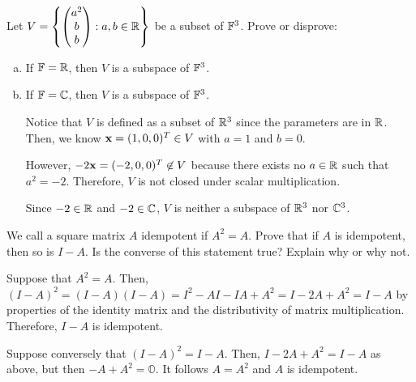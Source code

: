 \documentclass{agony}
\begin{document}
\begin{prob}
  Let $V = \qty{\mqty(a^2\\b\\b) : a,b\in\R}$ be a subset of $\mathbb{F}^3$.
  Prove or disprove:
\end{prob}
\begin{enumerate}[(a)]
  \item If $\mathbb{F}=\mathbb{R}$, then $V$ is a subspace of $\mathbb{F}^3$.
  \item If $\mathbb{F}=\mathbb{C}$, then $V$ is a subspace of $\mathbb{F}^3$.
        \begin{sol}
          Notice that $V$ is defined as a subset of $\mathbb{R}^3$ since the parameters are in $\mathbb{R}$.
          Then, we know $\vb x = (1,0,0)^T \in V$ with $a = 1$ and $b = 0$.

          However, $-2\vb x = (-2,0,0)^T \not\in V$ because there exists
          no $a \in \mathbb{R}$ such that $a^2 = -2$.
          Therefore, $V$ is not closed under scalar multiplication.

          Since $-2 \in \mathbb{R}$ and $-2 \in \mathbb{C}$, $V$ is neither a subspace of $\mathbb{R}^3$ nor $\mathbb{C}^3$.
        \end{sol}
\end{enumerate}

\begin{prob}
  We call a square matrix $A$ idempotent if $A^2=A$.
  Prove that if $A$ is idempotent, then so is $I-A$.
  Is the converse of this statement true? Explain why or why not.
\end{prob}
\begin{prf}
  Suppose that $A^2 = A$.
  Then, $(I-A)^2 = (I-A)(I-A) = I^2 - AI - IA + A^2 = I - 2A + A^2 = I-A$
  by properties of the identity matrix and the distributivity of matrix multiplication.
  Therefore, $I-A$ is idempotent.

  Suppose conversely that $(I-A)^2 = I-A$.
  Then, $I - 2A + A^2 = I - A$ as above, but then $-A + A^2 = \mathbb{O}$.
  It follows $A = A^2$ and $A$ is idempotent.
\end{prf}
\end{document}
